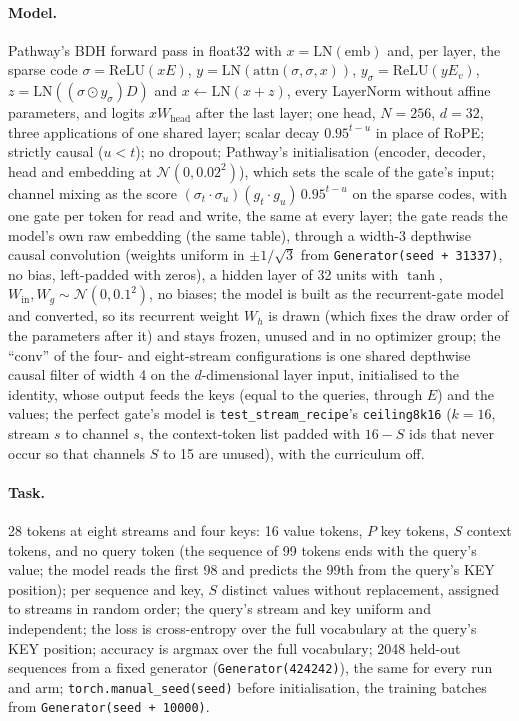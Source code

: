 \documentclass[11pt]{article}
\begin{document}
\paragraph{Model.} Pathway's BDH forward pass in float32 with $x = \mathrm{LN}(\mathrm{emb})$ and, per layer, the sparse code $\sigma = \mathrm{ReLU}(xE)$, $y = \mathrm{LN}(\mathrm{attn}(\sigma, \sigma, x))$, $y_\sigma = \mathrm{ReLU}(yE_v)$, $z = \mathrm{LN}((\sigma \odot y_\sigma)D)$ and $x \gets \mathrm{LN}(x + z)$, every LayerNorm without affine parameters, and logits $x W_{\mathrm{head}}$ after the last layer; one head, $N = 256$, $d = 32$, three applications of one shared layer; scalar decay $0.95^{t-u}$ in place of RoPE; strictly causal ($u < t$); no dropout; Pathway's initialisation (encoder, decoder, head and embedding at $\mathcal{N}(0, 0.02^2)$), which sets the scale of the gate's input; channel mixing as the score $(\sigma_t \cdot \sigma_u)(g_t \cdot g_u)\,0.95^{t-u}$ on the sparse codes, with one gate per token for read and write, the same at every layer; the gate reads the model's own raw embedding (the same table), through a width-3 depthwise causal convolution (weights uniform in $\pm 1/\sqrt{3}$ from \texttt{Generator(seed + 31337)}, no bias, left-padded with zeros), a hidden layer of 32 units with $\tanh$, $W_{\mathrm{in}}, W_g \sim \mathcal{N}(0, 0.1^2)$, no biases; the model is built as the recurrent-gate model and converted, so its recurrent weight $W_h$ is drawn (which fixes the draw order of the parameters after it) and stays frozen, unused and in no optimizer group; the ``conv'' of the four- and eight-stream configurations is one shared depthwise causal filter of width 4 on the $d$-dimensional layer input, initialised to the identity, whose output feeds the keys (equal to the queries, through $E$) and the values; the perfect gate's model is \texttt{test\_stream\_recipe}'s \texttt{ceiling8k16} ($k = 16$, stream $s$ to channel $s$, the context-token list padded with $16 - S$ ids that never occur so that channels $S$ to 15 are unused), with the curriculum off.

\paragraph{Task.} 28 tokens at eight streams and four keys: 16 value tokens, $P$ key tokens, $S$ context tokens, and no query token (the sequence of 99 tokens ends with the query's value; the model reads the first 98 and predicts the 99th from the query's KEY position); per sequence and key, $S$ distinct values without replacement, assigned to streams in random order; the query's stream and key uniform and independent; the loss is cross-entropy over the full vocabulary at the query's KEY position; accuracy is argmax over the full vocabulary; 2048 held-out sequences from a fixed generator (\texttt{Generator(424242)}), the same for every run and arm; \texttt{torch.manual\_seed(seed)} before initialisation, the training batches from \texttt{Generator(seed + 10000)}.
\end{document}
